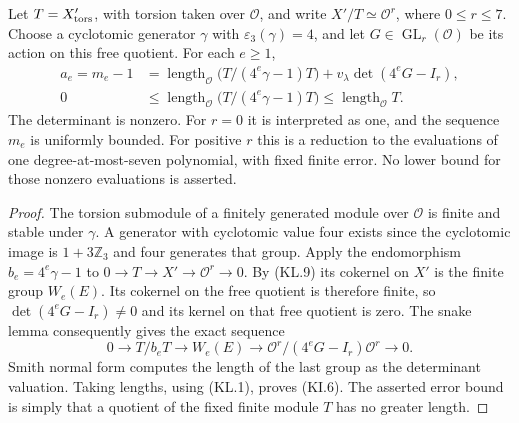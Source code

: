 \begin{corollary}
\label{AC-K16-matrix}
Let $T=X'_{\rm tors}$, with torsion taken over $\mathcal O$,
and write $X'/T\simeq\mathcal O^r$, where $0\leq r\leq7$.
Choose a cyclotomic generator $\gamma$ with
$\varepsilon_3(\gamma)=4$, and let
$G\in\operatorname{GL}_r(\mathcal O)$ be its action on this
free quotient.  For each $e\geq1$,
\[
 \begin{split}
 a_e=m_e-1
  &=\operatorname{length}_{\mathcal O}
          \bigl(T/(4^e\gamma-1)T\bigr)
      +v_\lambda\det(4^eG-I_r),\\
 0&\leq\operatorname{length}_{\mathcal O}
          \bigl(T/(4^e\gamma-1)T\bigr)
      \leq\operatorname{length}_{\mathcal O}T.
 \end{split}                                             \tag{KI.6}
\]
The determinant is nonzero.  For $r=0$ it is interpreted as
one, and the sequence $m_e$ is uniformly bounded.
For positive $r$ this is a reduction to the evaluations of
one degree-at-most-seven polynomial, with fixed finite error.
No lower bound for those nonzero evaluations is asserted.
\end{corollary}
\begin{proof}
The torsion submodule of a finitely generated module over
$\mathcal O$ is finite and stable under $\gamma$.
A generator with cyclotomic value four exists since the
cyclotomic image is $1+3\mathbb Z_3$ and four generates that
group.  Apply the endomorphism $b_e=4^e\gamma-1$ to
$0\to T\to X'\to\mathcal O^r\to0$.
By (KL.9) its cokernel on $X'$ is the finite group $W_e(E)$.
Its cokernel on the free quotient is therefore finite, so
$\det(4^eG-I_r)\ne0$ and its kernel on that free quotient
is zero.  The snake lemma consequently gives the exact sequence
\[
 0\longrightarrow T/b_eT\longrightarrow W_e(E)
 \longrightarrow\mathcal O^r/(4^eG-I_r)\mathcal O^r
 \longrightarrow0.                                    \tag{KI.7}
\]
Smith normal form computes the length of the last group as
the determinant valuation.  Taking lengths, using (KL.1),
proves (KI.6).  The asserted error bound is simply that a
quotient of the fixed finite module $T$ has no greater length.
\end{proof}

